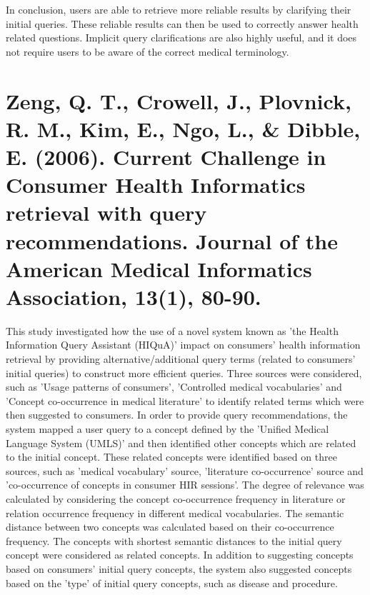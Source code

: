 \documentclass[]{article}
\begin{document}
In conclusion, users are able to retrieve more reliable results by clarifying their initial queries. These reliable results can then be used to correctly answer health related questions. Implicit query clarifications are also highly useful, and it does not require users to be aware of the correct medical terminology.       
    	
\section{Zeng, Q. T., Crowell, J., Plovnick, R. M., Kim, E., Ngo, L., \& Dibble, E. (2006). Current Challenge in Consumer Health Informatics retrieval with query recommendations. Journal of the American Medical Informatics Association, 13(1), 80-90.}


This study investigated how the use of a novel system known as 'the  Health Information Query Assistant (HIQuA)' impact on consumers' health information retrieval by providing alternative/additional query terms (related to consumers' initial queries) to construct more efficient queries. Three sources were considered, such as 'Usage patterns of consumers', 'Controlled medical vocabularies' and 'Concept co-occurrence in medical literature' to identify related terms which were then suggested to consumers. In order to provide query recommendations, the system mapped a user query to a concept defined by the 'Unified Medical Language System (UMLS)' and then identified other concepts which are related to the initial concept. These related concepts were identified based on three sources, such as 'medical vocabulary' source, 'literature co-occurrence' source and 'co-occurrence of concepts in consumer HIR sessions'. The degree of relevance was calculated by considering the concept co-occurrence frequency in literature or relation occurrence frequency in different medical vocabularies. The semantic distance between two concepts was calculated based on their co-occurrence frequency. The concepts with shortest semantic distances to the initial query concept were considered as related concepts. In addition to suggesting concepts based on consumers' initial query concepts, the system also suggested concepts based on the 'type' of initial query concepts, such as disease and procedure.      
\end{document}
